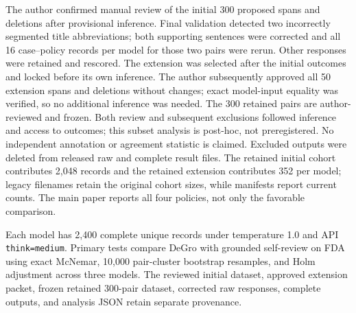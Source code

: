 \documentclass[10pt]{article}
\newcommand{\code}[1]{{\footnotesize\nolinkurl{#1}}}
\begin{document}
The author confirmed manual review of the initial 300 proposed spans and deletions after provisional inference. Final validation detected two incorrectly segmented title abbreviations; both supporting sentences were corrected and all 16 case--policy records per model for those two pairs were rerun. Other responses were retained and rescored. The extension was selected after the initial outcomes and locked before its own inference. The author subsequently approved all 50 extension spans and deletions without changes; exact model-input equality was verified, so no additional inference was needed. The 300 retained pairs are author-reviewed and frozen. Both review and subsequent exclusions followed inference and access to outcomes; this subset analysis is post-hoc, not preregistered. No independent annotation or agreement statistic is claimed. Excluded outputs were deleted from released raw and complete result files. The retained initial cohort contributes 2,048 records and the retained extension contributes 352 per model; legacy filenames retain the original cohort sizes, while manifests report current counts. The main paper reports all four policies, not only the favorable comparison.

Each model has 2,400 complete unique records under temperature 1.0 and API \code{think=medium}. Primary tests compare DeGro with grounded self-review on FDA using exact McNemar, 10,000 pair-cluster bootstrap resamples, and Holm adjustment across three models. The reviewed initial dataset, approved extension packet, frozen retained 300-pair dataset, corrected raw responses, complete outputs, and analysis JSON retain separate provenance.


\end{document}

